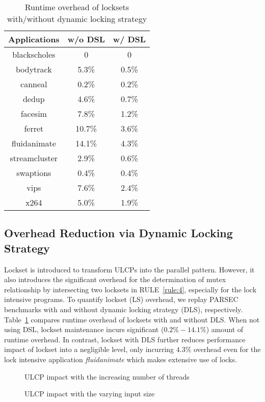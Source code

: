 \begin{table}[tbp]   \caption{Runtime overhead of locksets with/without dynamic locking strategy}
\small
\tabcolsep=0.1cm
\setlength{\abovecaptionskip}{10pt}
\setlength{\belowcaptionskip}{-10pt}
\centering
\centering
\begin{tabular}{|c|c|c|}\hline
\textbf{Applications}& \textbf{w/o DSL}& \textbf{w/ DSL} \\ \hline \hline
{\sf blackscholes}& 0& 0 \\
{\sf bodytrack}& 5.3\% & 0.5\% \\
{\sf canneal}& 0.2\%& 0.2\%\\
{\sf dedup} &4.6\% & 0.7\%\\
{\sf facesim}&7.8\% &1.2\%  \\
{\sf ferret}& 10.7\%&3.6\% \\
{\sf fluidanimate}& 14.1\%& 4.3\%  \\
{\sf streamcluster}& 2.9\%&0.6\% \\
{\sf swaptions}& 0.4\%& 0.4\% \\
{\sf vips} &7.6\% & 2.4\% \\
{\sf x264}& 5.0\%& 1.9\% \\ \hline
\end{tabular}
\label{table:dsl}
\end{table}
\subsection{Overhead Reduction via Dynamic Locking Strategy}
Lockset is introduced to transform ULCPs into the parallel pattern. However, it also introduces the significant overhead for the determination of mutex relationship by intersecting two locksets in RULE~\ref{rule:4}, especially for the lock intensive programs. To quantify lockset (LS) overhead, we replay PARSEC benchmarks with and without dynamic locking strategy (DLS), respectively. Table~\ref{table:dsl} compares runtime overhead of locksets with and without DLS. When not using DSL, lockset maintenance incurs significant ($0.2\%-14.1\%$) amount of runtime overhead. In contrast, lockset with DLS further reduces performance impact of lockset into a negligible level, only incurring $4.3\%$ overhead even for the lock intensive application \emph{fluidanimate} which makes extensive use of locks.


\begin{figure}[tpb]
\centering
 \hfill
 \caption{ULCP impact with the increasing number of threads}
 \label{fig:perfImpact:threadnum}
\end{figure}
\begin{figure}[tpb]
\centering
 \hfill
  \caption{ULCP impact with the varying input size}
 \label{fig:perfImpact:input}
\end{figure}
